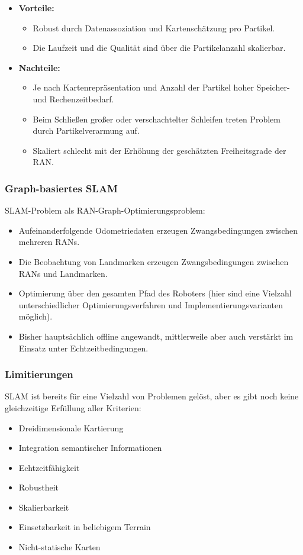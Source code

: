 				\begin{itemize}
					\item \textbf{Vorteile:}
						\begin{itemize}
							\item Robust durch Datenassoziation und Kartenschätzung pro Partikel.
							\item Die Laufzeit und die Qualität sind über die Partikelanzahl skalierbar.
						\end{itemize}
					\item \textbf{Nachteile:}
						\begin{itemize}
							\item Je nach Kartenrepräsentation und Anzahl der Partikel hoher Speicher- und Rechenzeitbedarf.
							\item Beim Schließen großer oder verschachtelter Schleifen treten Problem durch Partikelverarmung auf.
							\item Skaliert schlecht mit der Erhöhung der geschätzten Freiheitsgrade der RAN.
						\end{itemize}
				\end{itemize}

			\subsubsection{Graph-basiertes SLAM}
				SLAM-Problem als RAN-Graph-Optimierungsproblem:
				\begin{itemize}
					\item Aufeinanderfolgende Odometriedaten erzeugen Zwangsbedingungen zwischen mehreren RANs.
					\item Die Beobachtung von Landmarken erzeugen Zwangsbedingungen zwischen RANs und Landmarken.
					\item Optimierung über den gesamten Pfad des Roboters (hier sind eine Vielzahl unterschiedlicher Optimierungsverfahren und Implementierungsvarianten möglich).
					\item Bisher hauptsächlich offline angewandt, mittlerweile aber auch verstärkt im Einsatz unter Echtzeitbedingungen.
				\end{itemize}

			\subsubsection{Limitierungen}
				SLAM ist bereits für eine Vielzahl von Problemen gelöst, aber es gibt noch keine gleichzeitige Erfüllung aller Kriterien:
				\begin{itemize}
					\item Dreidimensionale Kartierung
					\item Integration semantischer Informationen
					\item Echtzeitfähigkeit
					\item Robustheit
					\item Skalierbarkeit
					\item Einsetzbarkeit in beliebigem Terrain
					\item Nicht-statische Karten
				\end{itemize}
			
